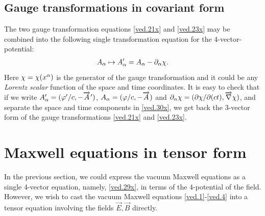 \subsection{Gauge transformations in covariant form}
The two gauge transformation equations  \eqref{ved.21x} and
\eqref{ved.23x} may be combined into the following single
transformation equation for the 4-vector-potential:
\begin{align}\label{ved.30x}
 A_{{\alpha}} \mapsto A'_{{\alpha}} = A_{{\alpha}} - {\partial}_{{\alpha}} {\chi} .
\end{align}
Here ${\chi}  = {\chi} (x^{{\alpha}})$ is the generator of the gauge 
transformation and it could be any \textsl{Lorentz scalar} 
function of the space and time coordinates. It is easy to 
check that if we write $A'_{{\alpha}} = (\varphi'/c,-{\overrightarrow{A}\hspace*{.3pt}'})$, $A_{{\alpha}} = (\varphi/c,-\overrightarrow{A})$ and  ${\partial}_{{\alpha}}  {\chi} = 
({\partial}{{\chi}}/{\partial}(ct), {\overrightarrow{\nabla} } {\chi} )$, and separate the space 
and time components in \eqref{ved.30x}, we get back the 
3-vector form of the gauge transformations \eqref{ved.21x} 
and \eqref{ved.23x}.

\section{Maxwell equations in tensor form}
In the previous section, we could express the vacuum  
Maxwell equations as a single 4-vector equation, namely, 
\eqref{ved.29x}, in terms of  the 4-potential of the field. 
However, we wish to cast the vacuum Maxwell equations 
\eqref{ved.1}-\eqref{ved.4} into a tensor equation 
involving 
the fields $\vec{E},\vec{B}$ directly. 

